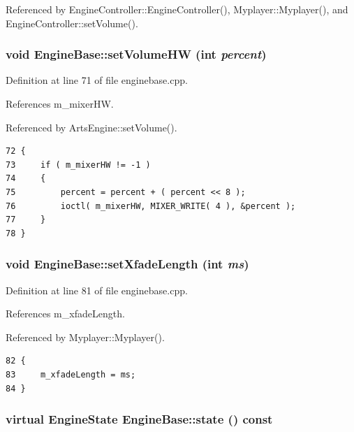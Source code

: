 Referenced by Engine\-Controller::Engine\-Controller(), Myplayer::Myplayer(), and Engine\-Controller::set\-Volume().
\subsubsection{\setlength{\rightskip}{0pt plus 5cm}void Engine\-Base::set\-Volume\-HW (int {\em percent})\hspace{0.3cm}{\tt  [protected]}}\label{classEngineBase_EngineBaseb2}




Definition at line 71 of file enginebase.cpp.

References m\_\-mixer\-HW.

Referenced by Arts\-Engine::set\-Volume().



\footnotesize\begin{verbatim}72 {
73     if ( m_mixerHW != -1 )
74     {
75         percent = percent + ( percent << 8 );
76         ioctl( m_mixerHW, MIXER_WRITE( 4 ), &percent );
77     }
78 }
\end{verbatim}\normalsize 
{}
\subsubsection{\setlength{\rightskip}{0pt plus 5cm}void Engine\-Base::set\-Xfade\-Length (int {\em ms})\hspace{0.3cm}{\tt  [virtual]}}\label{classEngineBase_EngineBasea24}




Definition at line 81 of file enginebase.cpp.

References m\_\-xfade\-Length.

Referenced by Myplayer::Myplayer().



\footnotesize\begin{verbatim}82 {
83     m_xfadeLength = ms;
84 }
\end{verbatim}\normalsize 
{}
\subsubsection{\setlength{\rightskip}{0pt plus 5cm}virtual {\bf Engine\-State} Engine\-Base::state () const\hspace{0.3cm}{\tt  [pure virtual]}}\label{classEngineBase_EngineBasea8}




